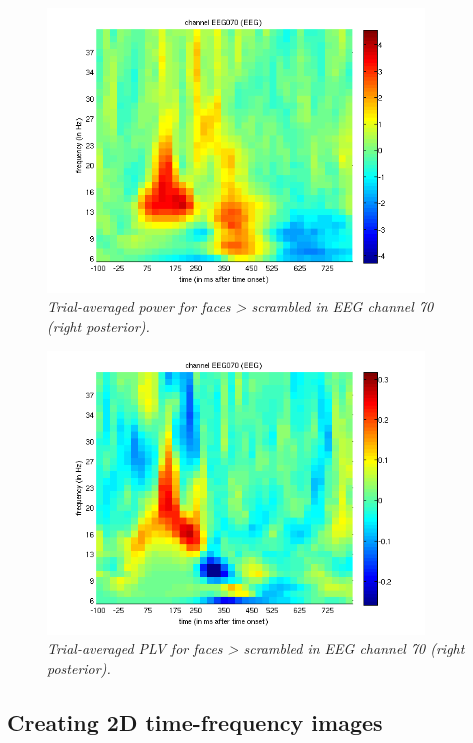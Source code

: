 \begin{figure}
\begin{center}
\includegraphics[width=100mm]{multi/figures/figure8}
\caption{\em Trial-averaged power for faces > scrambled in EEG channel 70 (right posterior). \label{multi:fig:8}}
\end{center}
\end{figure}

\begin{figure}
\begin{center}
\includegraphics[width=100mm]{multi/figures/figure9}
\caption{\em Trial-averaged PLV for faces > scrambled in EEG channel 70 (right posterior). \label{multi:fig:9}}
\end{center}
\end{figure}

\subsection{Creating 2D time-frequency images}

